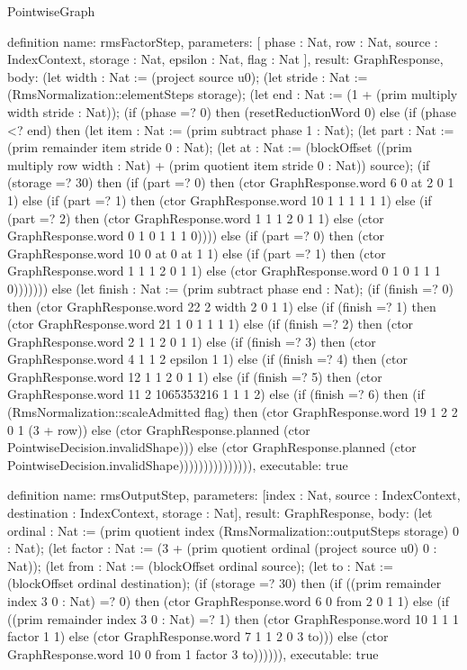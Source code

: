 \begin{lexlean}{PointwiseGraph}
\begin{semanticmodule}
definition{
  name: rmsFactorStep,
  parameters: [
    phase : Nat,
    row : Nat,
    source : IndexContext,
    storage : Nat,
    epsilon : Nat,
    flag : Nat
  ],
  result: GraphResponse,
  body: (let width : Nat := (project source u0); (let stride : Nat := (RmsNormalization::elementSteps storage); (let end : Nat := (1 + (prim multiply width stride : Nat)); (if (phase =? 0) then (resetReductionWord 0) else (if (phase <? end) then (let item : Nat := (prim subtract phase 1 : Nat); (let part : Nat := (prim remainder item stride 0 : Nat); (let at : Nat := (blockOffset ((prim multiply row width : Nat) + (prim quotient item stride 0 : Nat)) source); (if (storage =? 30) then (if (part =? 0) then (ctor GraphResponse.word 6 0 at 2 0 1 1) else (if (part =? 1) then (ctor GraphResponse.word 10 1 1 1 1 1 1) else (if (part =? 2) then (ctor GraphResponse.word 1 1 1 2 0 1 1) else (ctor GraphResponse.word 0 1 0 1 1 1 0)))) else (if (part =? 0) then (ctor GraphResponse.word 10 0 at 0 at 1 1) else (if (part =? 1) then (ctor GraphResponse.word 1 1 1 2 0 1 1) else (ctor GraphResponse.word 0 1 0 1 1 1 0))))))) else (let finish : Nat := (prim subtract phase end : Nat); (if (finish =? 0) then (ctor GraphResponse.word 22 2 width 2 0 1 1) else (if (finish =? 1) then (ctor GraphResponse.word 21 1 0 1 1 1 1) else (if (finish =? 2) then (ctor GraphResponse.word 2 1 1 2 0 1 1) else (if (finish =? 3) then (ctor GraphResponse.word 4 1 1 2 epsilon 1 1) else (if (finish =? 4) then (ctor GraphResponse.word 12 1 1 2 0 1 1) else (if (finish =? 5) then (ctor GraphResponse.word 11 2 1065353216 1 1 1 2) else (if (finish =? 6) then (if (RmsNormalization::scaleAdmitted flag) then (ctor GraphResponse.word 19 1 2 2 0 1 (3 + row)) else (ctor GraphResponse.planned (ctor PointwiseDecision.invalidShape))) else (ctor GraphResponse.planned (ctor PointwiseDecision.invalidShape))))))))))))))),
  executable: true
}

definition{
  name: rmsOutputStep,
  parameters: [index : Nat, source : IndexContext, destination : IndexContext, storage : Nat],
  result: GraphResponse,
  body: (let ordinal : Nat := (prim quotient index (RmsNormalization::outputSteps storage) 0 : Nat); (let factor : Nat := (3 + (prim quotient ordinal (project source u0) 0 : Nat)); (let from : Nat := (blockOffset ordinal source); (let to : Nat := (blockOffset ordinal destination); (if (storage =? 30) then (if ((prim remainder index 3 0 : Nat) =? 0) then (ctor GraphResponse.word 6 0 from 2 0 1 1) else (if ((prim remainder index 3 0 : Nat) =? 1) then (ctor GraphResponse.word 10 1 1 1 factor 1 1) else (ctor GraphResponse.word 7 1 1 2 0 3 to))) else (ctor GraphResponse.word 10 0 from 1 factor 3 to)))))),
  executable: true
}


\end{semanticmodule}
\end{lexlean}
